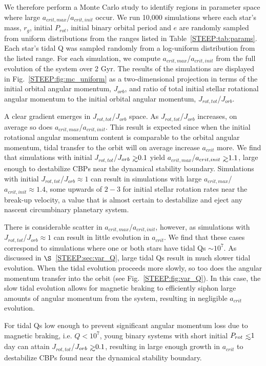 We therefore perform a Monte Carlo study to identify regions in parameter space where large $a_{crit,max}$/$a_{crit,init}$ occur.  We run 10,000 simulations where each star's mass, $r_g$, initial $P_{rot}$, initial binary orbital period and $e$ are randomly sampled from uniform distributions from the ranges listed in Table~\ref{STEEP:tab:params}.  Each star's tidal Q was sampled randomly from a log-uniform distribution from the listed range.  For each simulation, we compute $a_{crit,max}$/$a_{crit,init}$ from the full evolution of the system over 2 Gyr.  The results of the simulations are displayed in Fig.~\ref{STEEP:fig:mc_uniform} as a two-dimensional projection in terms of the initial orbital angular momentum, $J_{orb}$, and ratio of total initial stellar rotational angular momentum to the initial orbital angular momentum, $J_{rot,tot}$/$J_{orb}$.

A clear gradient emerges in $J_{rot,tot}$/$J_{orb}$ space.  As $J_{rot,tot}$/$J_{orb}$ increases, on average so does $a_{crit,max}$/$a_{crit,init}$.  This result is expected since when the initial rotational angular momentum content is comparable to the orbital angular momentum, tidal transfer to the orbit will on average increase $a_{crit}$ more.  We find that simulations with initial $J_{rot,tot}$/$J_{orb} \gsim 0.1$ yield $a_{crit,max}$/$a_{crit,init} \gsim 1.1$, large enough to destabilize CBPs near the dynamical stability boundary.  Simulations with initial $J_{rot,tot}$/$J_{orb} \approx 1$ can result in simulations with large $a_{crit,max}$/$a_{crit,init} \approx 1.4$, some upwards of $2-3$ for initial stellar rotation rates near the break-up velocity, a value that is almost certain to destabilize and eject any nascent circumbinary planetary system.

There is considerable scatter in $a_{crit,max}$/$a_{crit,init}$, however, as simulations with $J_{rot,tot}$/$J_{orb} \approx 1$ can result in little evolution in $a_{crit}$.  We find that these cases correspond to simulations where one or both stars have tidal Qs ${\sim}10^7$.  As discussed in $\S$~\ref{STEEP:sec:var_Q}, large tidal Qs result in much slower tidal evolution.  When the tidal evolution proceeds more slowly, so too does the angular momentum transfer into the orbit (see Fig.~\ref{STEEP:fig:var_Q}).  In this case, the slow tidal evolution allows for magnetic braking to efficiently siphon large amounts of angular momentum from the system, resulting in negligible $a_{crit}$ evolution.

For tidal Qs low enough to prevent significant angular momentum loss due to magnetic braking, i.e. $Q < 10^7$, young binary systems with short initial $P_{rot} \lsim 1$ day can attain $J_{rot,tot}$/$J_{orb} \gsim 0.1$, resulting in large enough growth in $a_{crit}$ to destabilize CBPs found near the dynamical stability boundary.  

